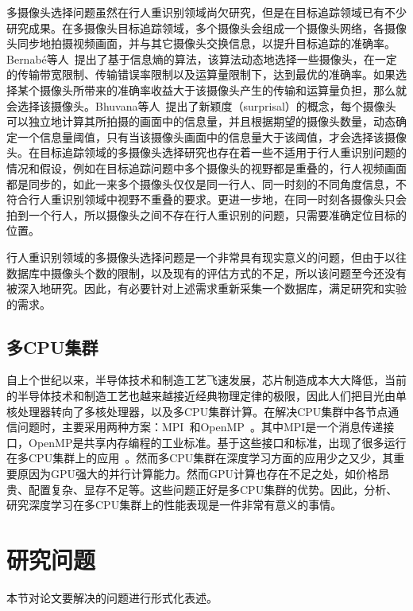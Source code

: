 多摄像头选择问题虽然在行人重识别领域尚欠研究，但是在目标追踪领域已有不少研究成果。在多摄像头目标追踪领域，多个摄像头会组成一个摄像头网络，各摄像头同步地拍摄视频画面，并与其它摄像头交换信息，以提升目标追踪的准确率。Bernab{\'e}等人~\cite{de2012entropy}提出了基于信息熵的算法，该算法动态地选择一些摄像头，在一定的传输带宽限制、传输错误率限制以及运算量限制下，达到最优的准确率。如果选择某个摄像头所带来的准确率收益大于该摄像头产生的传输和运算量负担，那么就会选择该摄像头。Bhuvana等人~\cite{bhuvana2016multi}提出了新颖度（surprisal）的概念，每个摄像头可以独立地计算其所拍摄的画面中的信息量，并且根据期望的摄像头数量，动态确定一个信息量阈值，只有当该摄像头画面中的信息量大于该阈值，才会选择该摄像头。在目标追踪领域的多摄像头选择研究也存在着一些不适用于行人重识别问题的情况和假设，例如在目标追踪问题中多个摄像头的视野都是重叠的，行人视频画面都是同步的，如此一来多个摄像头仅仅是同一行人、同一时刻的不同角度信息，不符合行人重识别领域中视野不重叠的要求。更进一步地，在同一时刻各摄像头只会拍到一个行人，所以摄像头之间不存在行人重识别的问题，只需要准确定位目标的位置。

行人重识别领域的多摄像头选择问题是一个非常具有现实意义的问题，但由于以往数据库中摄像头个数的限制，以及现有的评估方式的不足，所以该问题至今还没有被深入地研究。因此，有必要针对上述需求重新采集一个数据库，满足研究和实验的需求。

\subsection{多CPU集群}

自上个世纪以来，半导体技术和制造工艺飞速发展，芯片制造成本大大降低，当前的半导体技术和制造工艺也越来越接近经典物理定律的极限，因此人们把目光由单核处理器转向了多核处理器，以及多CPU集群计算。在解决CPU集群中各节点通信问题时，主要采用两种方案：MPI~\cite{sur2006high}和OpenMP~\cite{dagum1998openmp}。其中MPI是一个消息传递接口，OpenMP是共享内存编程的工业标准。基于这些接口和标准，出现了很多运行在多CPU集群上的应用~\cite{rabenseifner2009hybrid,ayguade2009design}。然而多CPU集群在深度学习方面的应用少之又少，其重要原因为GPU强大的并行计算能力。然而GPU计算也存在不足之处，如价格昂贵、配置复杂、显存不足等。这些问题正好是多CPU集群的优势。因此，分析、研究深度学习在多CPU集群上的性能表现是一件非常有意义的事情。

\section{研究问题}

本节对论文要解决的问题进行形式化表述。

